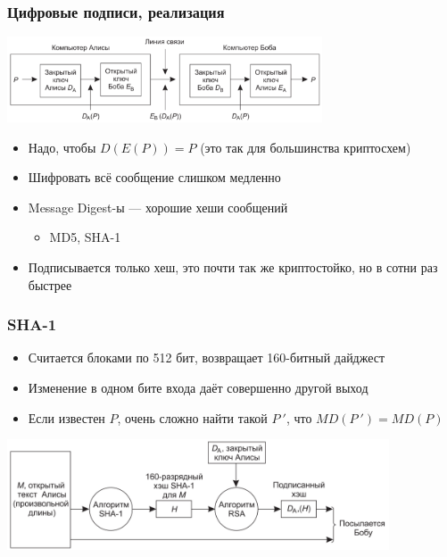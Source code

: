 \documentclass{../cscslides}
\begin{document}
    \begin{frame}
        \frametitle{Цифровые подписи, реализация}
        \begin{center}
            \includegraphics[width=0.7\textwidth]{signature.png}
        \end{center}
        \begin{itemize}
            \item Надо, чтобы $D(E(P)) = P$ (это так для большинства криптосхем)
            \item Шифровать всё сообщение слишком медленно
            \item Message Digest-ы --- хорошие хеши сообщений
            \begin{itemize}
                \item MD5, SHA-1
            \end{itemize}
            \item Подписывается только хеш, это почти так же криптостойко, но в сотни раз быстрее
        \end{itemize}
    \end{frame}

    \begin{frame}
        \frametitle{SHA-1}
        \begin{itemize}
            \item Считается блоками по 512 бит, возвращает 160-битный дайджест
            \item Изменение в одном бите входа даёт совершенно другой выход
            \item Если известен $P$, очень сложно найти такой $P\ '$, что $MD(P\ ') = MD(P)$
        \end{itemize}
        \begin{center}
            \includegraphics[width=0.85\textwidth]{sha1Signature.png}
        \end{center}
    \end{frame}
\end{document}
